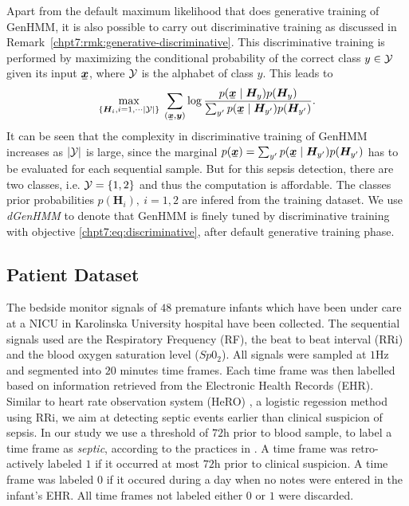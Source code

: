 Apart from the default maximum likelihood that does generative training of GenHMM, it is also possible to carry out discriminative training as discussed in Remark~\ref{chpt7:rmk:generative-discriminative}.
This discriminative training is performed by maximizing the conditional probability of the correct class $y\in \mathcal{Y}$ given its input $\ubm{x}$, where $\mathcal{Y}$ is the alphabet of class $y$. This leads to
\begin{equation} \label{chpt7:eq:discriminative}
\umax{\left\{ \bm{H}_i, i=1, \cdots \abs{\Yy} \right\}}{}\sum_{(\ubm{x},\bm{y})} \log \frac{p(\ubm{x}\mid\bm{H}_{{y}})p(\bm{H}_{{y}})}{\sum_{y^{\prime}}p(\ubm{x}\mid\bm{H}_{y^{\prime}})p(\bm{H}_{y^{\prime}})}.
\end{equation}
It can be seen that the complexity in discriminative training of GenHMM increases as $| \mathcal{Y} |$ is large, since the marginal $p(\ubm{x})= \sum_{y^{\prime}}p(\ubm{x}\mid\bm{H}_{y^{\prime}})p(\bm{H}_{y^{\prime}})$ has to be evaluated for each sequential sample. But for this sepsis detection, there are two classes, i.e. $\mathcal{Y} = \left\{ 1,2 \right\}$ and thus the computation is affordable.
The classes prior probabilities $p(\bm{H}_{i}),~i=1,2$ are infered from the training dataset. We use \textit{dGenHMM} to denote that GenHMM is finely tuned by discriminative training with objective \eqref{chpt7:eq:discriminative}, after default generative training phase.

\subsection{Patient Dataset}
The bedside monitor signals of $48$ premature infants which have been under care at a NICU in Karolinska University hospital have been collected.
The sequential signals used are the Respiratory Frequency (RF), the beat to beat interval (RRi) and the blood oxygen saturation level ($Sp0_2$).
All signals were sampled at $1$Hz and segmented into $20$ minutes time frames.
Each time frame was then labelled based on information retrieved from the Electronic Health Records (EHR).
Similar to heart rate observation system (HeRO) \cite{hicksHeartRateObservation2013, griffinHeartRateCharacteristics2005}, a logistic regession method using RRi, we aim at detecting septic events earlier than clinical suspicion of sepsis.
In our study we use a threshold of $72$h prior to blood sample, to label a time frame as \textit{septic}, according to the practices in \cite{gurMathematicalAlgorithmDetection2014}.
A time frame was retro-actively labeled $1$ if it occurred at most $72$h prior to clinical suspicion.
A time frame was labeled $0$ if it occured during a day when no notes were entered in the infant's EHR.
All time frames not labeled either $0$ or $1$ were discarded.

